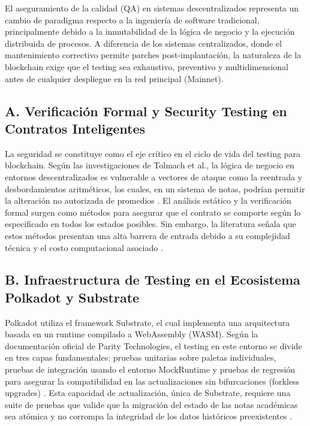 El aseguramiento de la calidad (QA) en sistemas descentralizados representa un cambio de paradigma respecto a la ingeniería de software tradicional, principalmente debido a la inmutabilidad de la lógica de negocio y la ejecución distribuida de procesos. A diferencia de los sistemas centralizados, donde el mantenimiento correctivo permite parches post-implantación, la naturaleza de la blockchain exige que el testing sea exhaustivo, preventivo y multidimensional antes de cualquier despliegue en la red principal (Mainnet).

\subsection*{A. Verificación Formal y Security Testing en Contratos Inteligentes}
La seguridad se constituye como el eje crítico en el ciclo de vida del testing para blockchain. Según las investigaciones de Tolmach et al., la lógica de negocio en entornos descentralizados es vulnerable a vectores de ataque como la reentrada y desbordamientos aritméticos, los cuales, en un sistema de notas, podrían permitir la alteración no autorizada de promedios \cite{tolmach2021survey}. El análisis estático y la verificación formal surgen como métodos para asegurar que el contrato se comporte según lo especificado en todos los estados posibles. Sin embargo, la literatura señala que estos métodos presentan una alta barrera de entrada debido a su complejidad técnica y el costo computacional asociado \cite{tolmach2021survey}.

\subsection*{B. Infraestructura de Testing en el Ecosistema Polkadot y Substrate}

Polkadot utiliza el framework Substrate, el cual implementa una arquitectura basada en un runtime compilado a WebAssembly (WASM). Según la documentación oficial de Parity Technologies, el testing en este entorno se divide en tres capas fundamentales: pruebas unitarias sobre paletas individuales, pruebas de integración usando el entorno MockRuntime y pruebas de regresión para asegurar la compatibilidad en las actualizaciones sin bifurcaciones (forkless upgrades) \cite{parity2024substrate}. Esta capacidad de actualización, única de Substrate, requiere una suite de pruebas que valide que la migración del estado de las notas académicas sea atómica y no corrompa la integridad de los datos históricos preexistentes \cite{parity2024substrate}.

